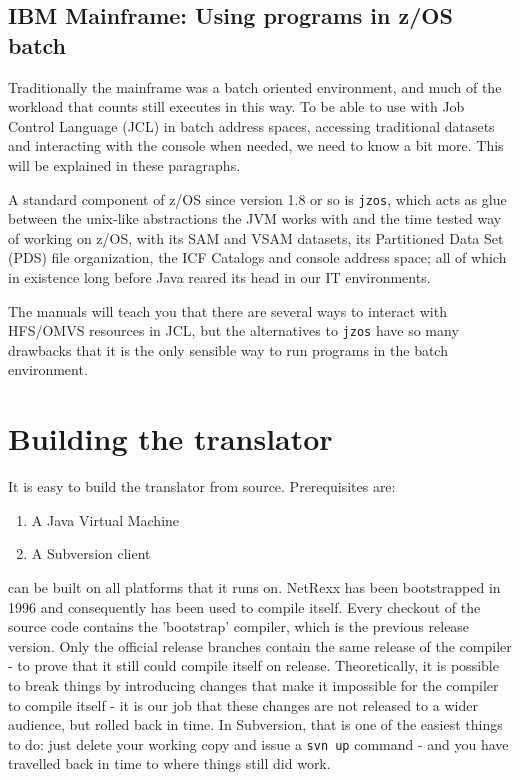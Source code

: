 \section{IBM Mainframe: Using \nr{} programs in z/OS batch}
Traditionally the mainframe was a batch oriented environment, and much
of the workload that counts still executes in this way. To be able to
use \nr{}with Job Control Language (JCL) in batch address spaces,
accessing traditional datasets and interacting with the console when
needed, we need to know a bit more. This will be explained in these paragraphs.

A standard component of z/OS since version 1.8 or so is \texttt{jzos},
which acts as glue between the unix-like abstractions the JVM works
with and the time tested way of working on z/OS, with its SAM and VSAM
datasets, its Partitioned Data Set (PDS) file organization, the ICF
Catalogs and console address space; all of which in existence long
before Java reared its head in our IT environments.

The manuals will teach you that there are several ways to
interact with HFS/OMVS resources in JCL, but the alternatives to
\texttt{jzos} have so many drawbacks that it is the only
sensible way to run \nr{} programs in the batch environment. 
\chapter{Building the \nr{} translator}
It is easy to build the \nr{} translator from source. Prerequisites
are:
\begin{enumerate}
\item A Java Virtual Machine
\item A Subversion client
\end{enumerate}
\nr{} can be built on all platforms that it runs on.  NetRexx has been
bootstrapped in 1996 and consequently has been used to compile
itself. Every checkout of the source code contains the 'bootstrap'
compiler, which is the previous release version. Only the official
release branches contain the same release of the compiler - to prove
that it still could compile itself on release. Theoretically, it is
possible to break things by introducing changes that make it
impossible for the compiler to compile itself - it is our job that
these changes are not released to a wider audience, but rolled back in
time. In Subversion, that is one of the easiest things to do: just
delete your working copy and issue a \texttt{svn up} command - and you
have travelled back in time to where things still did work.
